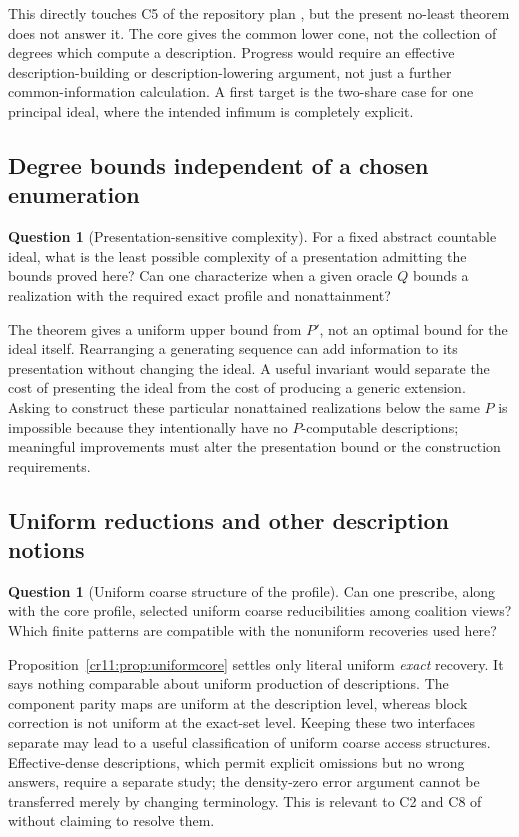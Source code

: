 \documentclass[11pt,letterpaper]{article}
\theoremstyle{plain}
\theoremstyle{definition}
\newtheorem{question}[theorem]{Question}
\theoremstyle{remark}
\numberwithin{equation}{section}
\begin{document}
This directly touches C5 of the repository plan \cite{RepoPlan}, but the
present no-least theorem does not answer it. The core gives the common lower
cone, not the collection of degrees which compute a description. Progress
would require an effective description-building or description-lowering
argument, not just a further common-information calculation. A first target
is the two-share case for one principal ideal, where the intended infimum
is completely explicit.

\subsection{Degree bounds independent of a chosen enumeration}

\begin{question}[Presentation-sensitive complexity]\label{cr11:q:bounds}
For a fixed abstract countable ideal, what is the least possible complexity
of a presentation admitting the bounds proved here? Can one characterize
when a given oracle $Q$ bounds a realization with the required exact
profile and nonattainment?
\end{question}

The theorem gives a uniform upper bound from $P'$, not an optimal bound
for the ideal itself. Rearranging a generating sequence can add information
to its presentation without changing the ideal. A useful invariant would
separate the cost of presenting the ideal from the cost of producing a
generic extension. Asking to construct these particular nonattained
realizations below the same $P$ is impossible because they intentionally
have no $P$-computable descriptions; meaningful improvements must alter the
presentation bound or the construction requirements.

\subsection{Uniform reductions and other description notions}

\begin{question}[Uniform coarse structure of the profile]\label{cr11:q:uniform}
Can one prescribe, along with the core profile, selected uniform coarse
reducibilities among coalition views? Which finite patterns are compatible
with the nonuniform recoveries used here?
\end{question}

Proposition~\ref{cr11:prop:uniformcore} settles only literal uniform
\emph{exact} recovery. It says nothing comparable about uniform production
of descriptions. The component parity maps are uniform at the description
level, whereas block correction is not uniform at the exact-set level.
Keeping these two interfaces separate may lead to a useful classification
of uniform coarse access structures. Effective-dense descriptions, which
permit explicit omissions but no wrong answers, require a separate study;
the density-zero error argument cannot be transferred merely by changing
terminology. This is relevant to C2 and C8 of \cite{RepoPlan} without
claiming to resolve them.
\end{document}
